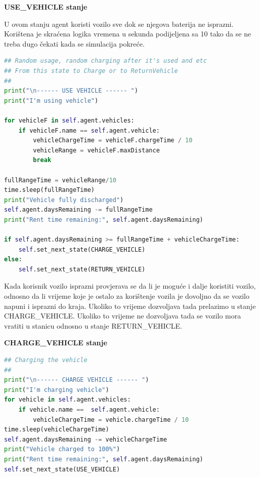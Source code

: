 \documentclass{foi}
\begin{document}
\begin{flushleft}\textbf{USE\_VEHICLE stanje}\end{flushleft}

U ovom stanju agent koristi vozilo sve dok se njegova baterija ne isprazni. Korištena je skraćena logika vremena u sekunda podijeljena sa 10 tako da se ne treba dugo čekati kada se simulacija pokreće. 

\begin{lstlisting}[language=Python]
## Random usage, random charging after it's used and etc
## From this state to Charge or to ReturnVehicle
##
print("\n------ USE VEHICLE ------ ")
print("I'm using vehicle")

for vehicleF in self.agent.vehicles:
	if vehicleF.name == self.agent.vehicle:
		vehicleChargeTime = vehicleF.chargeTime / 10
		vehicleRange = vehicleF.maxDistance
		break

fullRangeTime = vehicleRange/10
time.sleep(fullRangeTime)
print("Vehicle fully discharged")
self.agent.daysRemaining -= fullRangeTime
print("Rent time remaining:", self.agent.daysRemaining)

if self.agent.daysRemaining >= fullRangeTime + vehicleChargeTime:
	self.set_next_state(CHARGE_VEHICLE)    
else:
	self.set_next_state(RETURN_VEHICLE)    
\end{lstlisting}

Kada korisnik vozilo isprazni provjerava se da li je moguće i dalje koristiti vozilo, odnosno da li vrijeme koje je ostalo za korištenje vozila je dovoljno da se vozilo napuni i isprazni do kraja. Ukoliko to vrijeme dozvoljava tada prelazimo u stanje CHARGE\_VEHICLE. Ukoliko to vrijeme ne dozvoljava tada se vozilo mora vratiti u stanicu odnosno u stanje RETURN\_VEHICLE.

\begin{flushleft}\textbf{CHARGE\_VEHICLE stanje}\end{flushleft}

\begin{lstlisting}[language=Python]
 ## Charging the vehicle
##
print("\n------ CHARGE VEHICLE ------ ")
print("I'm charging vehicle")
for vehicle in self.agent.vehicles:
	if vehicle.name ==  self.agent.vehicle:
		vehicleChargeTime = vehicle.chargeTime / 10
time.sleep(vehicleChargeTime)
self.agent.daysRemaining -= vehicleChargeTime
print("Vehicle charged to 100%")
print("Rent time remaining:", self.agent.daysRemaining)
self.set_next_state(USE_VEHICLE)
\end{lstlisting}
\end{document}
